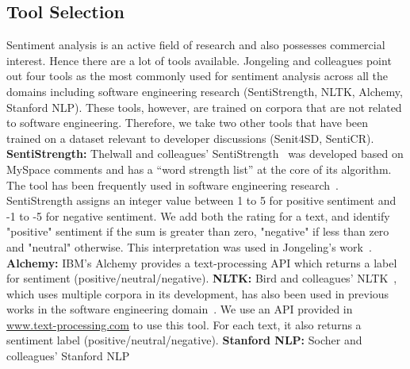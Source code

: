 \subsection{Tool Selection}
Sentiment analysis is an active field of research 
and also possesses commercial interest. 
Hence there are a lot of tools available. 
Jongeling and colleagues point out four tools 
as the most commonly used for sentiment analysis 
across all the domains 
including software engineering research 
(SentiStrength, NLTK, Alchemy, Stanford NLP).
These tools, however, 
are trained on corpora 
that are not related to software engineering.
Therefore, we take two other tools that have been trained on a dataset relevant to developer discussions (Senit4SD, SentiCR). 
\newline
\indent \textbf{SentiStrength:} Thelwall and colleagues' SentiStrength~\cite{thelwall2010sentiment} 
was developed based on MySpace comments 
and has a ``word strength list'' 
at the core of its algorithm. 
The tool has been frequently used in software engineering research~\cite{garcia2013role,guzman2014sentiment,novielli2015challenges,guzman2013towards,sinha2016analyzing}. 
SentiStrength assigns 
an integer value between 1 to 5 for positive sentiment 
and -1 to -5 for negative sentiment. 
We add both the rating for a text, 
and identify "positive" sentiment if the sum is greater than zero, "negative" if less than zero 
and "neutral" otherwise. 
This interpretation was used in Jongeling's work~\cite{jongeling2017negative}.
\newline
\indent\textbf{Alchemy:} IBM's Alchemy 
provides a text-processing API 
which returns a label for sentiment 
(positive/neutral/negative). 
\newline
\indent\textbf{NLTK:} Bird and colleagues' NLTK~\cite{bird2009natural}, 
which uses multiple corpora in its development, 
has also been used in previous works 
in the software engineering domain~\cite{pletea2014security,rousinopoulos2014sentiment}. 
We use an API provided in \href{www.text-processing.com}{www.text-processing.com} 
to use this tool. 
For each text, it also returns a sentiment label
(positive/neutral/negative).
\newline
\indent\textbf{Stanford NLP:} Socher and colleagues' Stanford NLP 

